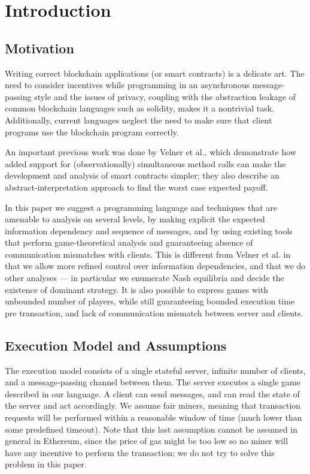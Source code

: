 \documentclass[acmsmall,review,anonymous]{acmart}\settopmatter{printfolios=true,printccs=false,printacmref=false}
\begin{document}
\section{Introduction}

\subsection{Motivation}
Writing correct blockchain applications (or smart contracts) is a delicate art. The need to consider incentives while programming in an asynchronous message-passing style and the issues of privacy, coupling with the abstraction leakage of common blockchain languages such as solidity, makes it a nontrivial task. Additionally, current languages neglect the need to make sure that client programs use the blockchain program correctly.

An important previous work was done by Velner et al., which demonstrate how added support for (observationally) simultaneous method calls can make the development and analysis of smart contracts simpler; they also describe an abstract-interpretation approach to find the worst case expected payoff.

In this paper we suggest a programming language and techniques that are amenable to analysis on several levels, by making explicit the expected information dependency and sequence of messages, and by using existing tools that perform game-theoretical analysis and guaranteeing absence of communication mismatches with clients. This is different from Velner et al. in that we allow more refined control over information dependencies, and that we do other analyses --- in particular we enumerate Nash equilibria and decide the existence of dominant strategy. It is also possible to express games with unbounded number of players, while still guaranteeing bounded execution time pre transaction, and lack of communication mismatch between server and clients.

\subsection{Execution Model and Assumptions}
The execution model consists of a single stateful server, infinite number of clients, and a message-passing channel between them. The server executes a single game described in our language. A client can send messages, and can read the state of the server and act accordingly. We assume fair miners, meaning that transaction requests will be performed within a reasonable window of time (much lower than some predefined timeout). Note that this last assumption cannot be assumed in general in Ethereum, since the price of gas might be too low so no miner will have any incentive to perform the transaction; we do not try to solve this problem in this paper.
\end{document}
